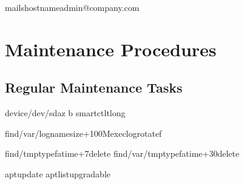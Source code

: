 \documentclass[letterpaper,10pt,english]{sphinxmanual}
\begin{document}
\begin{sphinxVerbatim}[commandchars=\\\{\}]
\PYGZgt{}

mail\PYGZhy{}shostnameadmin@company.com\PYGZlt{}
\end{sphinxVerbatim}


\section{Maintenance Procedures}
\label{\detokenize{best-practices:maintenance-procedures}}

\subsection{Regular Maintenance Tasks}
\label{\detokenize{best-practices:regular-maintenance-tasks}}
\sphinxAtStartPar
{}

\begin{sphinxVerbatim}[commandchars=\\\{\}]

device/dev/sd\PYG{o}{[}a\PYGZhy{}z\PYG{o}{]}
\PYG{o}{[}\PYGZhy{}b\PYG{o}{]}
smartctl\PYGZhy{}tlong

find/var/log\PYGZhy{}name\PYGZhy{}size+100M\PYGZhy{}execlogrotate\PYGZhy{}f

find/tmp\PYGZhy{}typef\PYGZhy{}atime+7\PYGZhy{}delete
find/var/tmp\PYGZhy{}typef\PYGZhy{}atime+30\PYGZhy{}delete

aptupdate
aptlist\PYGZhy{}\PYGZhy{}upgradable
\end{sphinxVerbatim}
\end{document}
